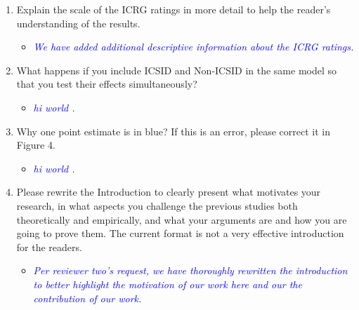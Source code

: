 \begin{enumerate}
\begin{itemize}
	\end{itemize}
	\item Explain the scale of the ICRG ratings in more detail to help the reader’s understanding of the results.	
	\begin{itemize}
		\item \textcolor{blue}{ \emph{ We have added additional descriptive information about the ICRG ratings. }}
	\end{itemize}
	\item What happens if you include ICSID and Non-ICSID in the same model so that you test their effects simultaneously?		
	\begin{itemize}
		\item \textcolor{blue}{ \emph{ hi world . }}
	\end{itemize}
	\item Why one point estimate is in blue? If this is an error, please correct it in Figure 4.	
	\begin{itemize}
		\item \textcolor{blue}{ \emph{ hi world . }}
	\end{itemize}
	\item Please rewrite the Introduction to clearly present what motivates your research, in what aspects you challenge the previous studies both theoretically and empirically, and what your arguments are and how you are going to prove them. The current format is not a very effective introduction for the readers.
	\begin{itemize}
		\item \textcolor{blue}{ \emph{
		Per reviewer two's request, we have thoroughly rewritten the introduction to better highlight the motivation of our work here and our the contribution of our work.
		}}
	\end{itemize}	
\end{enumerate}